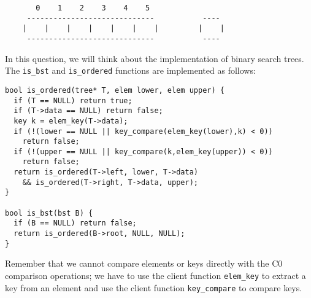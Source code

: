 \documentclass[12pt]{exam}
\begin{document}
\begin{questions}
\begin{parts}
\begin{solution}
\begin{verbatim}
       0    1    2    3    4    5           
     -----------------------------           ----
    |    |    |    |    |    |    |         |    |
     -----------------------------           ----
\end{verbatim}
\end{solution}

% 

\end{parts}

\vspace{.5in}


In this question, we will think about the implementation of binary
search trees. The \verb|is_bst| and \verb|is_ordered| functions are
implemented as follows:

\begin{verbatim}
bool is_ordered(tree* T, elem lower, elem upper) {
  if (T == NULL) return true;
  if (T->data == NULL) return false;
  key k = elem_key(T->data);
  if (!(lower == NULL || key_compare(elem_key(lower),k) < 0))
    return false;
  if (!(upper == NULL || key_compare(k,elem_key(upper)) < 0))
    return false;
  return is_ordered(T->left, lower, T->data)
    && is_ordered(T->right, T->data, upper);
}

bool is_bst(bst B) {
  if (B == NULL) return false;
  return is_ordered(B->root, NULL, NULL);
}
\end{verbatim}
Remember that we cannot compare elements or keys directly with the C0
comparison operations; we have to use the client function
\verb'elem_key' to extract a key from an element and use the client
function \verb'key_compare' to compare keys.

\newpage
{}
\end{questions}
\end{document}
